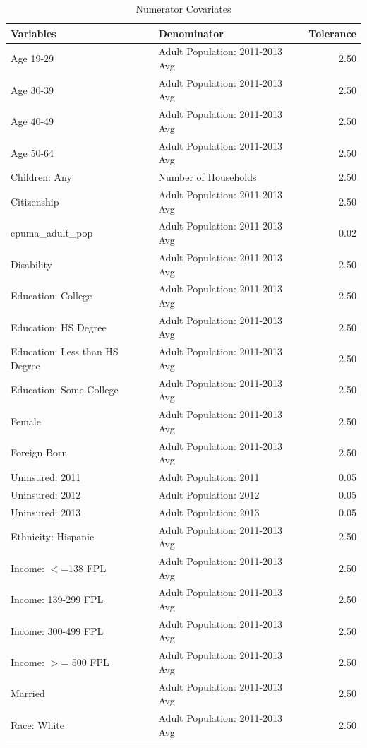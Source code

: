 \documentclass[12pt]{article}
\begin{document}
\begin{table}[ht]
\caption{Numerator Covariates}
\centering
\begin{tabular}{llr}
  \hline
Variables & Denominator & Tolerance \\ 
  \hline
Age 19-29 & Adult Population: 2011-2013 Avg & 2.50 \\ 
  Age 30-39 & Adult Population: 2011-2013 Avg & 2.50 \\ 
  Age 40-49 & Adult Population: 2011-2013 Avg & 2.50 \\ 
  Age 50-64 & Adult Population: 2011-2013 Avg & 2.50 \\ 
  Children: Any & Number of Households & 2.50 \\ 
  Citizenship & Adult Population: 2011-2013 Avg & 2.50 \\ 
  cpuma\_adult\_pop & Adult Population: 2011-2013 Avg & 0.02 \\ 
  Disability & Adult Population: 2011-2013 Avg & 2.50 \\ 
  Education: College & Adult Population: 2011-2013 Avg & 2.50 \\ 
  Education: HS Degree & Adult Population: 2011-2013 Avg & 2.50 \\ 
  Education: Less than HS Degree & Adult Population: 2011-2013 Avg & 2.50 \\ 
  Education: Some College & Adult Population: 2011-2013 Avg & 2.50 \\ 
  Female & Adult Population: 2011-2013 Avg & 2.50 \\ 
  Foreign Born & Adult Population: 2011-2013 Avg & 2.50 \\ 
  Uninsured: 2011 & Adult Population: 2011 & 0.05 \\ 
  Uninsured: 2012 & Adult Population: 2012 & 0.05 \\ 
  Uninsured: 2013 & Adult Population: 2013 & 0.05 \\ 
  Ethnicity: Hispanic & Adult Population: 2011-2013 Avg & 2.50 \\ 
  Income: $<$=138 FPL & Adult Population: 2011-2013 Avg & 2.50 \\ 
  Income: 139-299 FPL & Adult Population: 2011-2013 Avg & 2.50 \\ 
  Income: 300-499 FPL & Adult Population: 2011-2013 Avg & 2.50 \\ 
  Income: $>$= 500 FPL & Adult Population: 2011-2013 Avg & 2.50 \\ 
  Married & Adult Population: 2011-2013 Avg & 2.50 \\ 
  Race: White & Adult Population: 2011-2013 Avg & 2.50 \\ 

\end{tabular}
\end{table}
\end{document}
